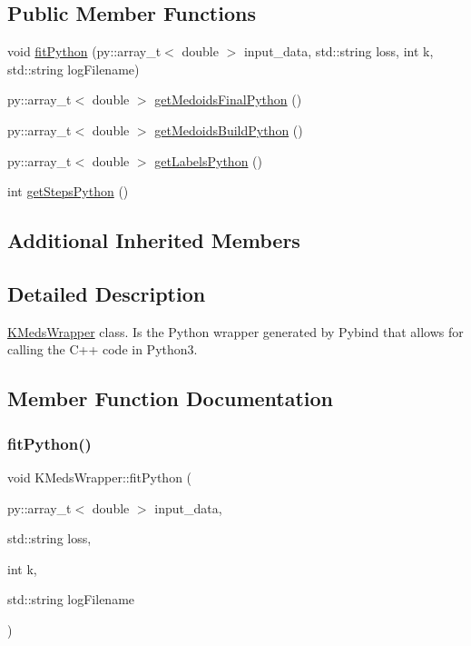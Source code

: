 \subsection*{Public Member Functions}
\begin{DoxyCompactItemize}
\item 
void \hyperlink{classKMedsWrapper_ac0311bd5d2aef638cf794e4412426d3c}{fit\+Python} (py\+::array\+\_\+t$<$ double $>$ input\+\_\+data, std\+::string loss, int k, std\+::string log\+Filename)
\item 
py\+::array\+\_\+t$<$ double $>$ \hyperlink{classKMedsWrapper_ae825241c43b8bf92912eb59cd12ae1c5}{get\+Medoids\+Final\+Python} ()
\item 
py\+::array\+\_\+t$<$ double $>$ \hyperlink{classKMedsWrapper_af272debff6f3b31490d20b8dc7bec322}{get\+Medoids\+Build\+Python} ()
\item 
py\+::array\+\_\+t$<$ double $>$ \hyperlink{classKMedsWrapper_aba0a92e75230b7853fd533657ead656e}{get\+Labels\+Python} ()
\item 
int \hyperlink{classKMedsWrapper_a25ac2830354eeae7963cdec34d0137e8}{get\+Steps\+Python} ()
\end{DoxyCompactItemize}
\subsection*{Additional Inherited Members}


\subsection{Detailed Description}
\hyperlink{classKMedsWrapper}{K\+Meds\+Wrapper} class. Is the Python wrapper generated by Pybind that allows for calling the C++ code in Python3. 

\subsection{Member Function Documentation}
\mbox{\label{classKMedsWrapper_ac0311bd5d2aef638cf794e4412426d3c}} 
\subsubsection{\texorpdfstring{fit\+Python()}{fitPython()}}
{\footnotesize\ttfamily void K\+Meds\+Wrapper\+::fit\+Python (\begin{DoxyParamCaption}\item[{py\+::array\+\_\+t$<$ double $>$}]{input\+\_\+data,  }\item[{std\+::string}]{loss,  }\item[{int}]{k,  }\item[{std\+::string}]{log\+Filename }\end{DoxyParamCaption})\hspace{0.3cm}{\ttfamily [inline]}}

